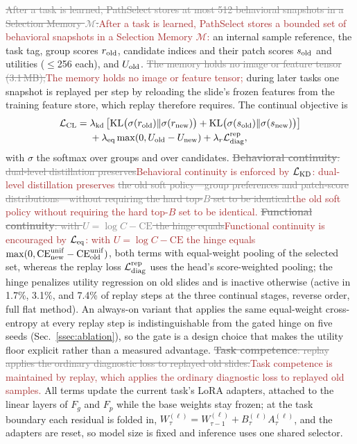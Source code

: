 \documentclass{article}
\newif\ifmarkup \markuptrue
\newcommand{\repc}[3]{\ifmarkup\textcolor{gray}{\sout{#2}}\textcolor{#1}{#3}\else#3\fi}
\newcommand{\repB}[2]{\repc{brown}{#1}{#2}}   %
\def\L{{\cal L}}
\newcommand{\Fg}{F_g}
\newcommand{\Fp}{F_p}
\newcommand{\Mem}{\mathcal{M}}
\begin{document}
\repB{After a task is learned, PathSelect stores at most 512 behavioral snapshots in a Selection Memory $\Mem$:}{After a task is learned, PathSelect stores a bounded set of behavioral snapshots in a Selection Memory $\Mem$:} an internal sample reference, the task tag, group scores $r_{\rm old}$, candidate indices and their patch scores $s_{\rm old}$ and utilities ($\le$256 each), and $U_{\rm old}$. \repB{The memory holds no image or feature tensor (3.1\,MB);}{The memory holds no image or feature tensor;} during later tasks one snapshot is replayed per step by reloading the slide's frozen features from the training feature store, which replay therefore requires. The continual objective is
\begin{align}
\L_{\mathrm{CL}}
={}&
\lambda_{\mathrm{kd}}
\left[
\mathrm{KL}\bigl(\sigma(r_{\mathrm{old}})\Vert \sigma(r_{\mathrm{new}})\bigr)
+
\mathrm{KL}\bigl(\sigma(s_{\mathrm{old}})\Vert \sigma(s_{\mathrm{new}})\bigr)
\right]
\nonumber\\
&+
\lambda_{\mathrm{eq}}
\max(0,U_{\mathrm{old}}-U_{\mathrm{new}})
+
\lambda_r \L_{\mathrm{diag}}^{\mathrm{rep}},
\label{eq:lcl}
\end{align}
with $\sigma$ the softmax over groups and over candidates. \repB{\textbf{Behavioral continuity}: dual-level distillation preserves}{Behavioral continuity is enforced by $\L_{\rm KD}$: dual-level distillation preserves} \repB{the old soft policy---group preferences and patch-score distributions---without requiring the hard top-$B$ set to be identical.}{the old soft policy without requiring the hard top-$B$ set to be identical.} \repB{\textbf{Functional continuity}: with $U=\log C-\mathrm{CE}$ the hinge equals}{Functional continuity is encouraged by $\L_{\rm eq}$: with $U=\log C-\mathrm{CE}$ the hinge equals} $\max(0,\mathrm{CE}^{\rm unif}_{\rm new}-\mathrm{CE}^{\rm unif}_{\rm old})$, both terms with equal-weight pooling of the selected set, whereas the replay loss $\L_{\mathrm{diag}}^{\mathrm{rep}}$ uses the head's score-weighted pooling; the hinge penalizes utility regression on old slides and is inactive otherwise (active in 1.7\%, 3.1\%, and 7.4\% of replay steps at the three continual stages, reverse order, full flat method). An always-on variant that applies the same equal-weight cross-entropy at every replay step is indistinguishable from the gated hinge on five seeds (Sec.~\ref{ssec:ablation}), so the gate is a design choice that makes the utility floor explicit rather than a measured advantage. \repB{\textbf{Task competence}: replay applies the ordinary diagnostic loss to replayed old slides.}{Task competence is maintained by replay, which applies the ordinary diagnostic loss to replayed old samples.} All terms update the current task's LoRA adapters, attached to the linear layers of $\Fg$ and $\Fp$ while the base weights stay frozen; at the task boundary each residual is folded in, $W^{(\ell)}_{\tau}=W^{(\ell)}_{\tau-1}+B^{(\ell)}_\tau A^{(\ell)}_\tau$, and the adapters are reset, so model size is fixed and inference uses one shared selector.
\end{document}
